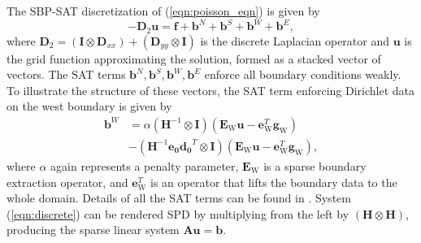  
The SBP-SAT discretization of (\ref{eqn:poisson_eqn}) is given by
\begin{equation}\label{eqn:discrete}
-\boldsymbol{D}_2\boldsymbol{u} = \boldsymbol{f} + \boldsymbol{b}^{N} + \boldsymbol{b}^{S} + \boldsymbol{b}^{W} + \boldsymbol{b}^{E},
\end{equation}
%
where $\boldsymbol{D}_2 = \left(\boldsymbol{I} \otimes \boldsymbol{D}_{xx}\right) +  \left(\boldsymbol{D}_{yy}  \otimes \boldsymbol{I}\right)$ is the discrete Laplacian operator and $\boldsymbol{u}$ is the grid function approximating the solution, formed as a stacked vector of vectors. The SAT terms $\boldsymbol{b}^{N}, \boldsymbol{b}^{S}, \boldsymbol{b}^{W}, \boldsymbol{b}^{E}$ enforce all boundary conditions weakly. To illustrate the structure of these vectors, the SAT term enforcing Dirichlet data on the west boundary is given by 
\begin{align}
\boldsymbol{b}^{W} &= \alpha \left(\boldsymbol{H}^{-1} \otimes \boldsymbol{I}\right) (\boldsymbol{E}_\text{W}\boldsymbol{u} - \boldsymbol{e}^T_\text{W}\boldsymbol{g}_\text{W}) \\ 
&- \left(\boldsymbol{H}^{-1}\boldsymbol{e_0}\boldsymbol{d_0}^T \otimes \boldsymbol{I}\right) (\boldsymbol{E}_\text{W}\boldsymbol{u} - \boldsymbol{e}^T_\text{W}\boldsymbol{g}_\text{W}),
\end{align}
where $\alpha$ again represents a penalty parameter, $\boldsymbol{E}_\text{W}$ is a sparse boundary extraction operator, and $\boldsymbol{e}^T_\text{W}$ is an operator that lifts the boundary data to the whole domain. Details of all the SAT terms can be found in \citep{Erickson2014}.
System (\ref{eqn:discrete}) can be rendered SPD by multiplying from the left by $\left(\boldsymbol{H} \otimes \boldsymbol{H}\right)$,  producing the sparse linear system $\boldsymbol{Au} = \boldsymbol{b}$.